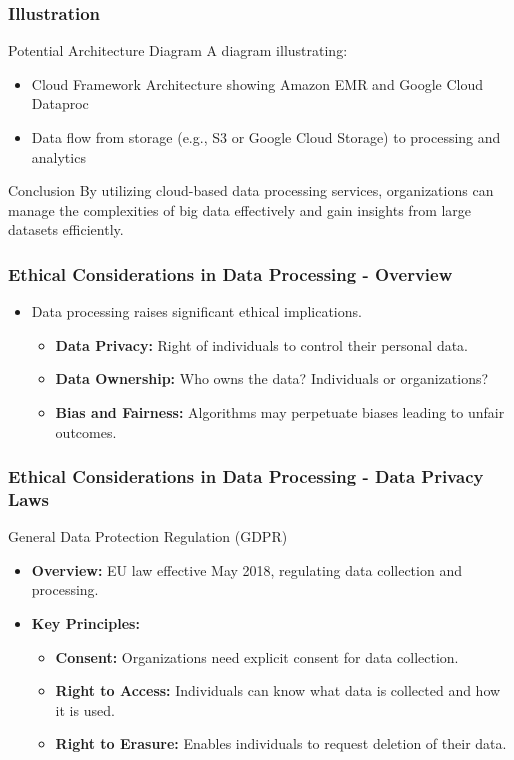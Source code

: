 \documentclass[aspectratio=169]{beamer}
\begin{document}
\begin{frame}[fragile]
    \frametitle{Illustration}
    \begin{block}{Potential Architecture Diagram}
        A diagram illustrating:
        \begin{itemize}
            \item Cloud Framework Architecture showing Amazon EMR and Google Cloud Dataproc
            \item Data flow from storage (e.g., S3 or Google Cloud Storage) to processing and analytics
        \end{itemize}
    \end{block}
    \begin{block}{Conclusion}
        By utilizing cloud-based data processing services, organizations can manage the complexities of big data effectively and gain insights from large datasets efficiently.
    \end{block}
\end{frame}

\begin{frame}[fragile]
    \frametitle{Ethical Considerations in Data Processing - Overview}
    \begin{itemize}
        \item Data processing raises significant ethical implications.
        \begin{itemize}
            \item \textbf{Data Privacy:} Right of individuals to control their personal data.
            \item \textbf{Data Ownership:} Who owns the data? Individuals or organizations?
            \item \textbf{Bias and Fairness:} Algorithms may perpetuate biases leading to unfair outcomes.
        \end{itemize}
    \end{itemize}
\end{frame}

\begin{frame}[fragile]
    \frametitle{Ethical Considerations in Data Processing - Data Privacy Laws}
    \begin{block}{General Data Protection Regulation (GDPR)}
        \begin{itemize}
            \item \textbf{Overview:} EU law effective May 2018, regulating data collection and processing.
            \item \textbf{Key Principles:}
            \begin{itemize}
                \item \textbf{Consent:} Organizations need explicit consent for data collection.
                \item \textbf{Right to Access:} Individuals can know what data is collected and how it is used.
                \item \textbf{Right to Erasure:} Enables individuals to request deletion of their data.
            \end{itemize}
        \end{itemize}
    \end{block}
\end{frame}
\end{document}
